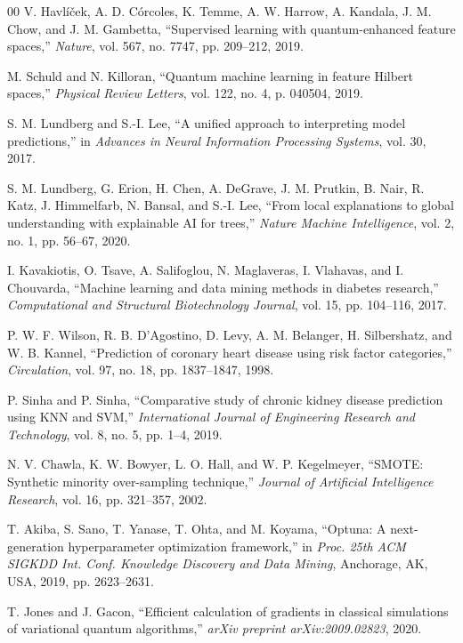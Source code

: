 ﻿\documentclass[conference]{IEEEtran}
\begin{document}
\begin{thebibliography}{00}
V. Havl\'{i}\v{c}ek, A. D. C\'{o}rcoles, K. Temme, A. W. Harrow, A. Kandala,
J. M. Chow, and J. M. Gambetta,
``Supervised learning with quantum-enhanced feature spaces,''
\textit{Nature}, vol. 567, no. 7747, pp. 209--212, 2019.

M. Schuld and N. Killoran,
``Quantum machine learning in feature Hilbert spaces,''
\textit{Physical Review Letters}, vol. 122, no. 4, p. 040504, 2019.

S. M. Lundberg and S.-I. Lee,
``A unified approach to interpreting model predictions,''
in \textit{Advances in Neural Information Processing Systems}, vol. 30, 2017.

S. M. Lundberg, G. Erion, H. Chen, A. DeGrave, J. M. Prutkin, B. Nair,
R. Katz, J. Himmelfarb, N. Bansal, and S.-I. Lee,
``From local explanations to global understanding with explainable AI for trees,''
\textit{Nature Machine Intelligence}, vol. 2, no. 1, pp. 56--67, 2020.

I. Kavakiotis, O. Tsave, A. Salifoglou, N. Maglaveras, I. Vlahavas, and I. Chouvarda,
``Machine learning and data mining methods in diabetes research,''
\textit{Computational and Structural Biotechnology Journal}, vol. 15, pp. 104--116, 2017.

P. W. F. Wilson, R. B. D'Agostino, D. Levy, A. M. Belanger, H. Silbershatz,
and W. B. Kannel,
``Prediction of coronary heart disease using risk factor categories,''
\textit{Circulation}, vol. 97, no. 18, pp. 1837--1847, 1998.

P. Sinha and P. Sinha,
``Comparative study of chronic kidney disease prediction using KNN and SVM,''
\textit{International Journal of Engineering Research and Technology}, vol. 8, no. 5,
pp. 1--4, 2019.

N. V. Chawla, K. W. Bowyer, L. O. Hall, and W. P. Kegelmeyer,
``SMOTE: Synthetic minority over-sampling technique,''
\textit{Journal of Artificial Intelligence Research}, vol. 16, pp. 321--357, 2002.

T. Akiba, S. Sano, T. Yanase, T. Ohta, and M. Koyama,
``Optuna: A next-generation hyperparameter optimization framework,''
in \textit{Proc. 25th ACM SIGKDD Int. Conf. Knowledge Discovery and Data Mining},
Anchorage, AK, USA, 2019, pp. 2623--2631.

T. Jones and J. Gacon,
``Efficient calculation of gradients in classical simulations of variational quantum
algorithms,''
\textit{arXiv preprint arXiv:2009.02823}, 2020.


\end{thebibliography}
\end{document}
